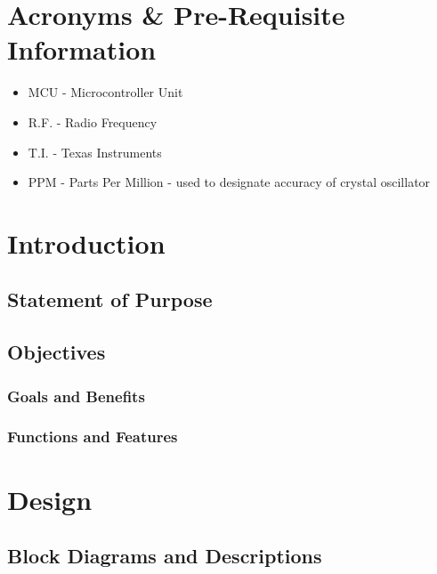 \documentclass[letterpaper,10pt]{article}
\newcommand{\buildtoc}{
	\clearpage
	\singlespacing
	\tableofcontents
	\onehalfspacing
}
\begin{document}
\maketitle
\pagestyle{fancy}
\begin{spacing}{1.15}


\color{black}
\buildtoc
{}
\section*{Acronyms \& Pre-Requisite Information}
\begin{itemize}
	\item MCU - Microcontroller Unit
	\item R.F. - Radio Frequency
	\item T.I. - Texas Instruments
	\item PPM - Parts Per Million - used to designate accuracy of crystal oscillator 
\end{itemize}
\clearpage
\setcounter{page}{1}

\section{Introduction}
\subsection{Statement of Purpose}

\subsection{Objectives}
\subsubsection{Goals and Benefits}
\subsubsection{Functions and Features}
\clearpage

\section{Design}
\subsection{Block Diagrams and Descriptions}


\end{spacing}
\end{document}
